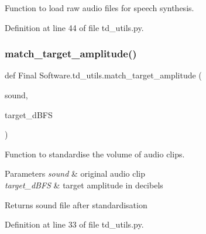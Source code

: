Function to load raw audio files for speech synthesis. 



Definition at line 44 of file td\+\_\+utils.\+py.

\mbox{\label{namespace_final_01_software_1_1td__utils_a9eab5c6041fb25b79329c1f18af48309}} 
\subsubsection{match\_target\_amplitude()}
{\footnotesize\ttfamily def Final Software.\+td\+\_\+utils.\+match\+\_\+target\+\_\+amplitude (\begin{DoxyParamCaption}\item[{}]{sound,  }\item[{}]{target\+\_\+d\+B\+FS }\end{DoxyParamCaption})}



Function to standardise the volume of audio clips. 


\begin{DoxyParams}{Parameters}
{\em sound} & original audio clip \\
\hline
{\em target\+\_\+d\+B\+FS} & target amplitude in decibels \\
\hline
\end{DoxyParams}
\begin{DoxyReturn}{Returns}
sound file after standardisation 
\end{DoxyReturn}


Definition at line 33 of file td\+\_\+utils.\+py.

